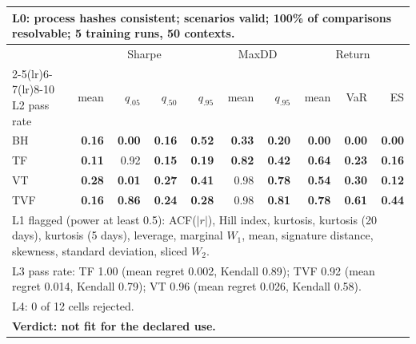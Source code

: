 \begin{tabular}{lrrrrrrrrr}
\toprule
\multicolumn{10}{p{13.5cm}}{L0: process hashes consistent; scenarios valid; 100\% of comparisons resolvable; 5 training runs, 50 contexts.} \\
\midrule
 & \multicolumn{4}{c}{Sharpe} & \multicolumn{2}{c}{MaxDD} & \multicolumn{3}{c}{Return} \\
\cmidrule(lr){2-5}\cmidrule(lr){6-7}\cmidrule(lr){8-10}
L2 pass rate & mean & $q_{.05}$ & $q_{.50}$ & $q_{.95}$ & mean & $q_{.95}$ & mean & VaR & ES \\
\midrule
BH & \textbf{0.16} & \textbf{0.00} & \textbf{0.16} & \textbf{0.52} & \textbf{0.33} & \textbf{0.20} & \textbf{0.00} & \textbf{0.00} & \textbf{0.00} \\
TF & \textbf{0.11} & 0.92 & \textbf{0.15} & \textbf{0.19} & \textbf{0.82} & \textbf{0.42} & \textbf{0.64} & \textbf{0.23} & \textbf{0.16} \\
VT & \textbf{0.28} & \textbf{0.01} & \textbf{0.27} & \textbf{0.41} & 0.98 & \textbf{0.78} & \textbf{0.54} & \textbf{0.30} & \textbf{0.12} \\
TVF & \textbf{0.16} & \textbf{0.86} & \textbf{0.24} & \textbf{0.28} & 0.98 & \textbf{0.81} & \textbf{0.78} & \textbf{0.61} & \textbf{0.44} \\
\midrule
\multicolumn{10}{p{13.5cm}}{L1 flagged (power at least 0.5): ACF($|r|$), Hill index, kurtosis, kurtosis (20 days), kurtosis (5 days), leverage, marginal $W_1$, mean, signature distance, skewness, standard deviation, sliced $W_2$.} \\
\multicolumn{10}{p{13.5cm}}{L3 pass rate: TF 1.00 (mean regret 0.002, Kendall 0.89); TVF 0.92 (mean regret 0.014, Kendall 0.79); VT 0.96 (mean regret 0.026, Kendall 0.58).} \\
\multicolumn{10}{p{13.5cm}}{L4: 0 of 12 cells rejected.} \\
\multicolumn{10}{p{13.5cm}}{\textbf{Verdict: not fit for the declared use.}} \\
\bottomrule
\end{tabular}
